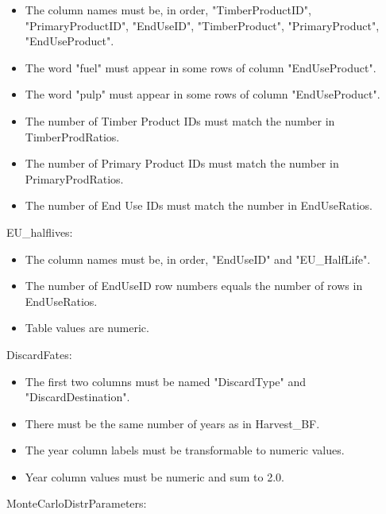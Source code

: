 \documentclass[
]{book}
\providecommand{\tightlist}{%
  \setlength{\itemsep}{0pt}\setlength{\parskip}{0pt}}
\begin{document}
\begin{itemize}
\tightlist
\item
  The column names must be, in order, "TimberProductID", "PrimaryProductID", "EndUseID", "TimberProduct", "PrimaryProduct", "EndUseProduct".\\
\item
  The word "fuel" must appear in some rows of column "EndUseProduct".\\
\item
  The word "pulp" must appear in some rows of column "EndUseProduct".\\
\item
  The number of Timber Product IDs must match the number in TimberProdRatios.\\
\item
  The number of Primary Product IDs must match the number in PrimaryProdRatios.\\
\item
  The number of End Use IDs must match the number in EndUseRatios.
\end{itemize}

EU\_halflives:

\begin{itemize}
\tightlist
\item
  The column names must be, in order, "EndUseID" and "EU\_HalfLife".\\
\item
  The number of EndUseID row numbers equals the number of rows in EndUseRatios.\\
\item
  Table values are numeric.
\end{itemize}

DiscardFates:

\begin{itemize}
\tightlist
\item
  The first two columns must be named "DiscardType" and "DiscardDestination".\\
\item
  There must be the same number of years as in Harvest\_BF.\\
\item
  The year column labels must be transformable to numeric values.\\
\item
  Year column values must be numeric and sum to 2.0.
\end{itemize}

MonteCarloDistrParameters:
\end{document}
